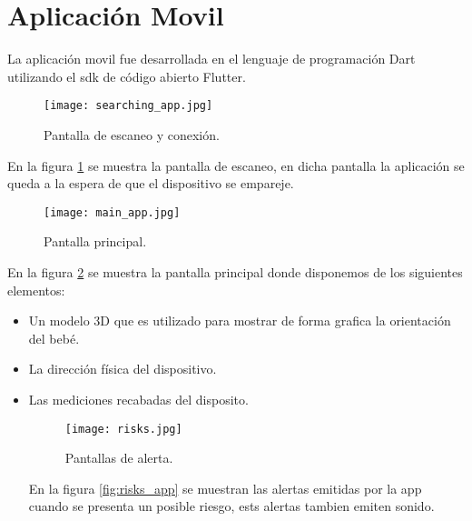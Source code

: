 \section{Aplicación Movil}
    La aplicación movil fue desarrollada en el lenguaje de 
    programación Dart utilizando el \acrshort{sdk} de código abierto 
    Flutter. 

    \begin{figure}[htp!]
        \centering
        \texttt{[image: searching\_app.jpg]}
        \caption{Pantalla de escaneo y conexión.}
        \label{fig: searching_app}
    \end{figure}
    \FloatBarrier

    En la figura \ref{fig: searching_app} se muestra la pantalla de escaneo, en dicha 
    pantalla la aplicación se queda a la espera de que el dispositivo
    se empareje.

    \begin{figure}[htp!]
        \centering
        \texttt{[image: main\_app.jpg]}
        \caption{Pantalla principal.}
        \label{fig: main_app}
    \end{figure}
    \FloatBarrier

    En la figura \ref{fig: main_app} se muestra la pantalla principal donde disponemos de los
    siguientes elementos: 
        \begin{itemize}
            \item Un modelo 3D que es utilizado para mostrar de forma grafica 
            la orientación del bebé.
            \item La dirección física del dispositivo.
            \item Las mediciones recabadas del disposito.
        
        \begin{figure}[htp!]
            \centering
            \texttt{[image: risks.jpg]}
            \caption{Pantallas de alerta.}
            \label{fig: risks_app}
        \end{figure}
        \FloatBarrier
        
    En la figura \ref{fig:risks_app} se muestran las alertas emitidas por la app cuando se presenta
    un posible riesgo, ests alertas tambien emiten sonido.

    \end{itemize}


